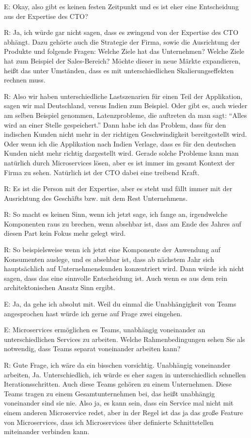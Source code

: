 E: Okay, also gibt es keinen festen Zeitpunkt und es ist eher eine Entscheidung aus der Expertise des CTO?

\label{appendix:r-12}
R: Ja, ich würde gar nicht sagen, dass es zwingend von der Expertise des CTO abhängt. Dazu gehörte auch die Strategie der Firma, sowie die Ausrichtung der Produkte und folgende Fragen: 
Welche Ziele hat das Unternehmen? Welche Ziele hat zum Beispiel der Sales-Bereich? Möchte dieser in neue Märkte expandieren, heißt das unter Umständen, dass es mit unterschiedlichen Skalierungseffekten rechnen muss.

R: Also wir haben unterschiedliche Lastszenarien für einen Teil der Applikation, sagen wir mal Deutschland, versus Indien zum Beispiel. Oder gibt es, auch wieder am selben Beispiel genommen, Latenzprobleme, die auftreten da man sagt: “Alles wird an einer Stelle gespeichert.” Dann habe ich das Problem, dass für den indischen Kunden nicht mehr in der richtigen Geschwindigkeit bereitgestellt wird. Oder wenn ich die Applikation nach Indien Verlage, dass es für den deutschen Kunden nicht mehr richtig dargestellt wird. Gerade solche Probleme kann man natürlich durch Microservices lösen, aber es ist immer im gesamt Kontext der Firma zu sehen. Natürlich ist der CTO dabei eine treibend Kraft.

\label{appendix:r-13}
R: Es ist die Person mit der Expertise, aber es steht und fällt immer mit der Ausrichtung des Geschäfts bzw. mit dem Rest Unternehmens.

\label{appendix:r-14}
R: So macht es keinen Sinn, wenn ich jetzt sage, ich fange an, irgendwelche Komponenten raus zu brechen, wenn absehbar ist, dass am Ende des Jahres auf diesen Part kein Fokus mehr gelegt wird.

R: So beispielsweise wenn ich jetzt eine Komponente der Anwendung auf Konsumenten auslege, und es absehbar ist, dass ab nächstem Jahr sich hauptsächlich auf Unternehmenskunden konzentriert wird. Dann würde ich nicht sagen, dass das eine sinnvolle Entscheidung ist. Auch wenn es aus dem rein architektonischen Ansatz Sinn ergibt.

E: Ja, da gehe ich absolut mit. Weil du einmal die Unabhängigkeit von Teams angesprochen hast würde ich gerne auf Frage zwei eingehen.

E: Microservices ermöglichen es Teams, unabhängig voneinander an unterschiedlichen Services zu arbeiten. Welche Rahmenbedingungen sehen Sie als notwendig, dass Teams separat voneinander arbeiten kann?

\label{appendix:r-15}
R: Gute Frage, ich wäre da ein bisschen vorsichtig. Unabhängig voneinander arbeiten, Ja. Unterschiedlich, ich würde es eher sagen in unterschiedlich schnellen Iterationsschritten. Auch diese Teams gehören zu einem Unternehmen. Diese Teams tragen zu einem Gesamtunternehmen bei, das heißt unabhängig voneinander sind sie nie.
Also ja, es kann sein, dass ein Service mal nicht mit einem anderen Microservice redet, aber in der Regel ist das ja das große Feature von Microservices, dass ich Microservices über definierte Schnittstellen miteinander verbinden kann.

